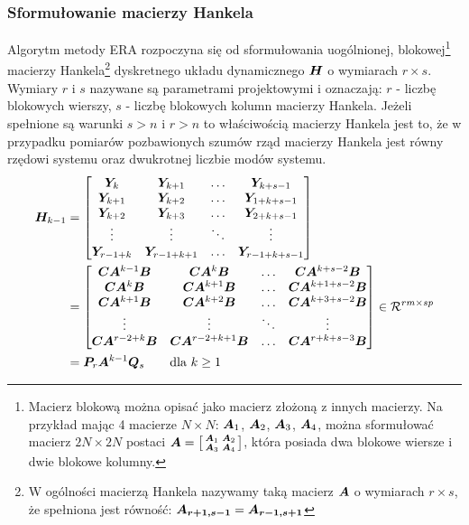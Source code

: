 \subsubsection{Sformułowanie macierzy Hankela} \label{section: hankelMatrix}
Algorytm metody ERA rozpoczyna się od sformułowania uogólnionej, blokowej\footnote{Macierz blokową można opisać jako macierz złożoną z innych macierzy. Na przykład mając 4 macierze $N \times N$: $\bm{A}_1$, $\bm{A}_2$, $\bm{A}_3$, $\bm{A}_4$, można sformułować macierz $2N\times2N$ postaci $\bm{A}=\big[\begin{smallmatrix}
		\bm{A}_1 & \bm{A}_2\\
		\bm{A}_3 & \bm{A}_4
	\end{smallmatrix}\big]$, która posiada dwa blokowe wiersze i dwie blokowe kolumny.
}  
macierzy Hankela\footnote{W ogólności macierzą Hankela nazywamy taką macierz $\bm{A}$ o wymiarach $r\times s$, że spełniona jest równość: $\bm{A_{r+1,s-1}}=\bm{A_{r-1,s+1}}$ 
} 
dyskretnego układu dynamicznego $\bm{H}$ o wymiarach $r\times s$. Wymiary $r$ i $s$ nazywane są parametrami projektowymi \parencite{Szafranski2013} i oznaczają: $r$ - liczbę blokowych wierszy, $s$ - liczbę blokowych kolumn macierzy Hankela. Jeżeli spełnione są warunki $s>n$ i $r>n$ to właściwością macierzy Hankela jest to, że w przypadku pomiarów pozbawionych szumów rząd macierzy Hankela jest równy rzędowi systemu oraz dwukrotnej liczbie modów systemu.
\begin{equation} \label{eq: genericHankelMatrix}
	\begin{split}
		\bm{H}_{k-1}&=\begin{bmatrix}
			\bm{Y}_k		&	\bm{Y}_{k+1} 	& \dots	& \bm{Y}_{k+s-1} \\
			\bm{Y}_{k+1}	&	\bm{Y}_{k+2}	& \dots	& \bm{Y}_{1+k+s-1} \\
			\bm{Y}_{k+2}	&	\bm{Y}_{k+3} 	& \dots	& \bm{Y}_{2+k+s-1} \\	
			\vdots			&	\vdots			& \ddots & \vdots\\
			\bm{Y}_{r-1+k}	&	\bm{Y}_{r-1+k+1} 	& \dots	& \bm{Y}_{r-1+k+s-1} 	
		\end{bmatrix} \\ 
		&= \begin{bmatrix}
			\bm{C}\bm{A}^{k-1}\bm{B}	&	\bm{C}\bm{A}^{k}\bm{B} 	& \dots	 & \bm{C}\bm{A}^{k+s-2}\bm{B} \\
			\bm{C}\bm{A}^{k}\bm{B}	&	\bm{C}\bm{A}^{k+1}\bm{B} 	& \dots	 & \bm{C}\bm{A}^{k+1+s-2}\bm{B} \\
			\bm{C}\bm{A}^{k+1}\bm{B}	&	\bm{C}\bm{A}^{k+2}\bm{B} 	& \dots	 & \bm{C}\bm{A}^{k+3+s-2}\bm{B} \\	
			\vdots							&	\vdots							& \ddots & \vdots\\
			\bm{C}\bm{A}^{r-2+k}\bm{B}	&	\bm{C}\bm{A}^{r-2+k+1}\bm{B} 	& \dots	 & \bm{C}\bm{A}^{r+k+s-3}\bm{B} 	
		\end{bmatrix}\in \mathcal{R}^{rm\times sp}\\
		&= \bm{P}_r \bm{A}^{k-1}\bm{Q}_s\qquad \text{dla } k\ge 1
	\end{split}
\end{equation}

